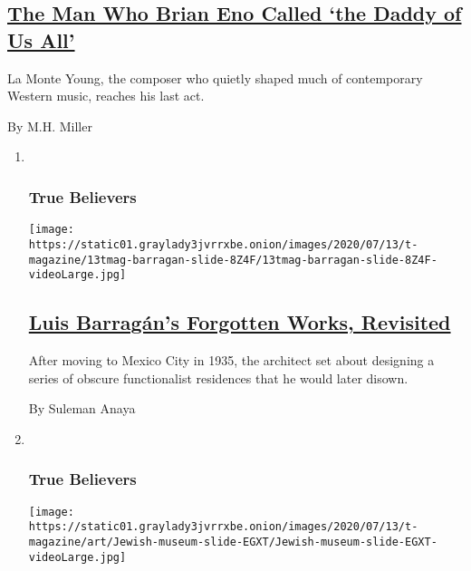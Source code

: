 \begin{enumerate}
  \hypertarget{the-man-who-brian-eno-called-the-daddy-of-us-all}{%
  \subsection{\texorpdfstring{\href{/2020/07/22/t-magazine/la-monte-young.html}{The
  Man Who Brian Eno Called `the Daddy of Us
  All'}}{The Man Who Brian Eno Called `the Daddy of Us All'}}\label{the-man-who-brian-eno-called-the-daddy-of-us-all}}

  La Monte Young, the composer who quietly shaped much of contemporary
  Western music, reaches his last act.

  By M.H. Miller
\end{enumerate}

\begin{enumerate}
\def\labelenumi{\arabic{enumi}.}
\item ~
  \hypertarget{true-believers-4}{%
  \subsubsection{True Believers}\label{true-believers-4}}

  \texttt{[image: https://static01.graylady3jvrrxbe.onion/images/2020/07/13/t-magazine/13tmag-barragan-slide-8Z4F/13tmag-barragan-slide-8Z4F-videoLarge.jpg]}

  \hypertarget{luis-barraguxe1ns-forgotten-works-revisited}{%
  \subsection{\texorpdfstring{\href{/2020/07/24/t-magazine/luis-barragan.html}{Luis
  Barragán's Forgotten Works,
  Revisited}}{Luis Barragán's Forgotten Works, Revisited}}\label{luis-barraguxe1ns-forgotten-works-revisited}}

  After moving to Mexico City in 1935, the architect set about designing
  a series of obscure functionalist residences that he would later
  disown.

  By Suleman Anaya
\item ~
  \hypertarget{true-believers-5}{%
  \subsubsection{True Believers}\label{true-believers-5}}

  \texttt{[image: https://static01.graylady3jvrrxbe.onion/images/2020/07/13/t-magazine/art/Jewish-museum-slide-EGXT/Jewish-museum-slide-EGXT-videoLarge.jpg]}


\end{enumerate}

